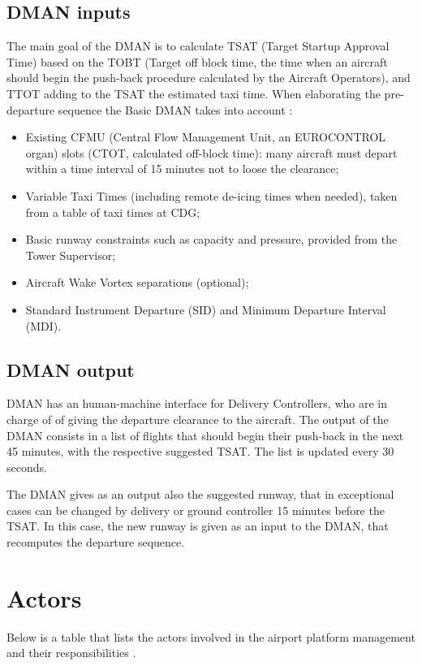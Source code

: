 \documentclass{article}
\begin{document}
\subsection{DMAN inputs}
The main goal of the DMAN is to calculate TSAT (Target Startup Approval Time) based on the TOBT (Target off block time, the time when an aircraft should begin the push-back procedure calculated by the Aircraft Operators), and TTOT adding to the TSAT the estimated taxi time. 
When elaborating the pre-departure sequence the Basic DMAN takes into account \cite{DMAN}:
\begin{itemize}
\item Existing CFMU (Central Flow Management Unit, an EUROCONTROL organ) slots (CTOT, calculated off-block time): many aircraft must depart within a time interval of 15 minutes not to loose the clearance;
\item Variable Taxi Times (including remote de-icing times when needed), taken from a table of taxi times at CDG;
\item Basic runway constraints such as capacity and pressure, provided from the Tower Supervisor;
\item Aircraft Wake Vortex separations (optional);
\item Standard Instrument Departure (SID) and Minimum Departure Interval (MDI).
\end{itemize}

\subsection{DMAN output}

DMAN has an human-machine interface for Delivery Controllers, who are in charge of  of giving the departure clearance to the aircraft. The output of the DMAN consists in a list of flights that should begin their push-back in the next 45 minutes, with the respective suggested TSAT. The list is updated every 30 seconds.

The DMAN gives as an output also the suggested runway, that in exceptional cases can be changed by delivery or ground controller 15 minutes before the TSAT. In this case, the new runway is given as an input to the DMAN, that recomputes the departure sequence. 


\section{Actors}
Below is a table that lists the actors involved in the airport platform management and their responsibilities \cite{DMAN}.
\end{document}
